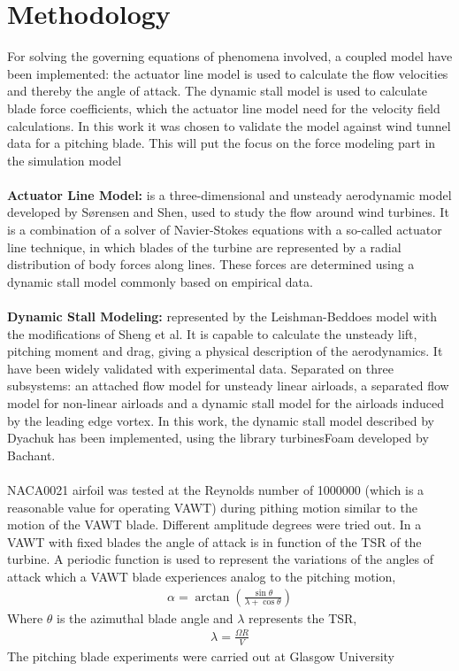 \documentclass[a4paper]{jpconf}
\begin{document}
\section{Methodology}
For solving the governing equations of phenomena involved, a coupled model have been implemented: the actuator line model is used to calculate the flow velocities and thereby the angle of attack. The dynamic stall model is used to calculate blade force coefficients, which the actuator line model need for the velocity field calculations. In this work it was chosen to validate the model against wind tunnel data for a pitching blade. This will put the focus on the force modeling part in the simulation model\\
\\
\textbf{Actuator Line Model:} is a three-dimensional and unsteady aerodynamic model developed by S{\o}rensen and Shen\cite{sorensen1999computation}, used to study the flow around wind turbines. It is a combination of a solver of Navier-Stokes equations with a so-called actuator line technique, in which blades of the turbine are represented by a radial distribution of body forces along lines. These forces are determined using a dynamic stall model commonly based on empirical data.\\  
\\
\textbf{Dynamic Stall Modeling:} represented by the Leishman-Beddoes model\cite{leishman1986generalised} with the modifications of Sheng et al\cite{sheng2008modified}. It is capable to calculate the unsteady lift, pitching moment and drag, giving a physical description of the aerodynamics. It have been widely validated with experimental data\cite{leishman1989semi}. Separated on three subsystems: an attached flow model for unsteady linear airloads, a separated flow model for non-linear airloads and a dynamic stall model for the airloads induced by the leading edge vortex. In this work, the dynamic stall model described by Dyachuk\cite{dyachuk} has been implemented, using the library turbinesFoam developed by Bachant\cite{bachant2015simulating}.\\
\\
NACA0021 airfoil was tested at the Reynolds number of 1000000 (which is a reasonable value for operating VAWT) during pithing motion similar to the motion of the VAWT blade. Different amplitude degrees were tried out. In a VAWT with fixed blades the angle of attack is in function of the TSR of the turbine. A periodic function is used to represent the variations of the angles of attack which a VAWT blade experiences analog to the pitching motion,
\begin{eqnarray}
\alpha = \arctan \left( \frac{\sin \theta}{\lambda + \cos \theta} \right)
\end{eqnarray}
Where $\theta$ is the azimuthal blade angle and $ \lambda $ represents the TSR, 
\begin{eqnarray}
\lambda =  \frac{\Omega R}{V} 
\end{eqnarray}
The pitching blade experiments were carried out at Glasgow University\cite{angell1988collected}\\
\end{document}
